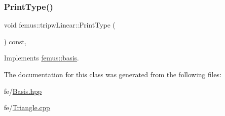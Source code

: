 \subsubsection{\texorpdfstring{Print\+Type()}{PrintType()}}
{\footnotesize\ttfamily void femus\+::tripw\+Linear\+::\+Print\+Type (\begin{DoxyParamCaption}{ }\end{DoxyParamCaption}) const\hspace{0.3cm}{\ttfamily [inline]}, {\ttfamily [virtual]}}



Implements \mbox{\hyperlink{classfemus_1_1basis_abbae7bf8f31ec5793c911bc6d4ea0572}{femus\+::basis}}.



The documentation for this class was generated from the following files\+:\begin{DoxyCompactItemize}
\item 
fe/\mbox{\hyperlink{_basis_8hpp}{Basis.\+hpp}}\item 
fe/\mbox{\hyperlink{_triangle_8cpp}{Triangle.\+cpp}}\end{DoxyCompactItemize}
